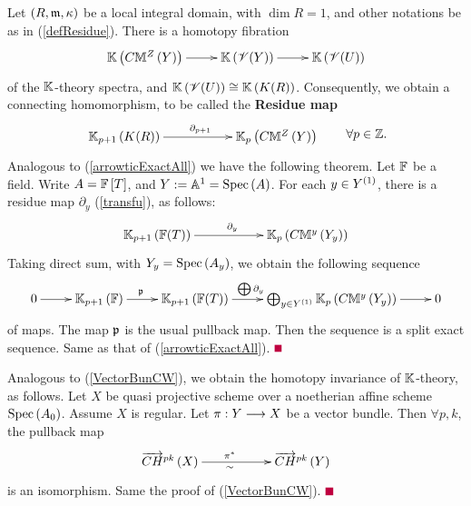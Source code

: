 \documentclass[12pt]{article}
\begin{document}
\bD\label{eaKdefResidue}{\rm 
Let $\left( R, \mathfrak {m}, \kappa\right)$ be a local integral domain, with $\dim R=1$, and other notations be as in 
(\ref{defResidue}).
 There is a homotopy fibration 
$$
\diagram 
{\BK}\LRf{C{\BM}^Z\LRf{Y}} \ar[r] & {\BK}\LRf{{\SV}(Y)} \ar[r] & {\BK}\LRf{{\SV}(U)} \\
\enddiagram 
$$
of the ${\mathbb{K}}$-theory spectra, and ${\mathbb{K}}\left( {\mathscr {V}}(U)\right)\cong {\mathbb{K}}\left( K(R)\right)$.
Consequently, we obtain a connecting homomorphism, to be called the {\bf Residue  map} 
\begin{equation}\label{eaKtransfu}
\diagram 
{\BK}_{p+1}\LRf{K(R)} \ar[rr]^{\partial_{p+1}} && {\BK}_p\LRf{C{\BM}^Z\LRf{Y}} 
\enddiagram \qquad \forall p\in {\BZ}.
\end{equation}
}
\eD
Analogous to (\ref{arrowticExactAll}) we have the following theorem.
\bT\label{eaKarrowticExactAll} {\rm 
Let ${\mathbb{F}}$ be a field. Write $A={\mathbb{F}}\left[ T\right]$, and $Y:={\mathbb{A}}^1=\mathrm{Spec}\left(A\right)$.  For each $y\in Y^{\left( 1\right)}$, there is a residue map $\partial_y$  (\ref{transfu}), as follows:
$$
\diagram
{\BK}_{p+1}\LRf{{\BF}(T)} \ar[rr]^{\partial_y}  &&  
{\BK}_{p}\LRf{C{\BM}^y\LRf{Y_y}} \\
\enddiagram
$$ 
%
 Taking direct sum, with $Y_y=\mathrm{Spec}\left(A_y\right)$, we obtain the following sequence
\begin{equation}\label{eaKprimeSeq}
\diagram
0\ar[r] &
{\BK}_{p+1}\LRf{{\BF}} \ar[r]^{\p\quad} &
{\BK}_{p+1}\LRf{{\BF}(T)} \ar[r]^{\bigoplus \partial_y\qquad }  & \bigoplus_{y\in Y^{\LRf{1}}}
{\BK}_{p}\LRf{C{\BM}^y\LRf{Y_y}}\ar[r] &0 \\
\enddiagram 
\end{equation}  
of maps. 
The map $\mathfrak {p}$ is the usual pullback map. 
Then the sequence is a split exact sequence.
}
\eT
\pf Same as that of (\ref{arrowticExactAll}). $\eop$ 

Analogous to (\ref{VectorBunCW}), we obtain the homotopy invariance of ${\mathbb{K}}$-theory, as follows.
\bT\label{eaKVectorBunCW}{\rm 
Let $X$ be quasi projective scheme over a noetherian affine scheme $\mathrm{Spec}\left(A_0\right)$. Assume   $X$ is regular.  Let 
$\pi: Y \longrightarrow X$ be a vector bundle. %
 Then $\forall p, k$, the pullback map
$$
\diagram 
\ora{CH}^{pk} \LRf{X} \ar[rr]^{\pi^*\quad}_{\sim\quad} && \ora{CH}^{pk}\LRf{Y} \\
\enddiagram 
$$
is  an isomorphism.  
}
\eT
\pf Same the proof of (\ref{VectorBunCW}). $\eop$
\end{document}
